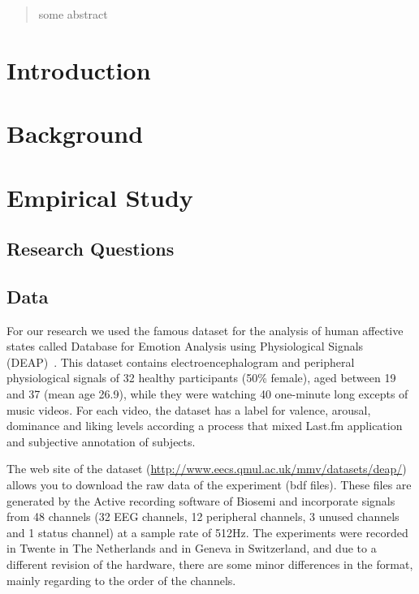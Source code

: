 \documentclass{sig-alternate}
\begin{document}
\maketitle
\begin{abstract}
some abstract
\end{abstract}



\section{Introduction}

\section{Background}

\section{Empirical Study}


\subsection{Research Questions}
	
\subsection{Data}

For our research we used the famous dataset for the analysis of human affective states called Database for Emotion Analysis using Physiological Signals (DEAP)~\cite{deap2011}. This dataset contains electroencephalogram and peripheral physiological signals of 32 healthy participants (50\% female), aged between 19 and 37 (mean age 26.9), while they were watching 40 one-minute long excepts of music videos. For each video, the dataset has a label for valence, arousal, dominance and liking levels according a process that mixed Last.fm application and subjective annotation of subjects. 

The web site of the dataset (\url{http://www.eecs.qmul.ac.uk/mmv/datasets/deap/}) allows you to download the raw data of the experiment (bdf files). These files are generated by the Active recording software of Biosemi and incorporate signals from 48 channels (32 EEG channels, 12 peripheral channels, 3 unused channels and 1 status channel) at a sample rate of 512Hz. The experiments were recorded in Twente in The Netherlands and in Geneva in Switzerland, and due to a different revision of the hardware, there are some minor differences in the format, mainly regarding to the order of the channels.
    
\end{document}
